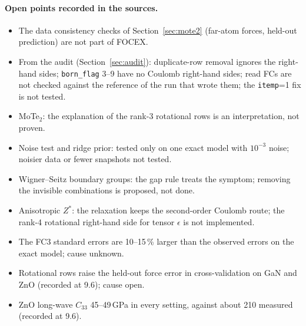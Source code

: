 \documentclass[11pt,a4paper]{article}
\newcommand{\code}[1]{\texttt{#1}}
\begin{document}
\paragraph{Open points recorded in the sources.}
\begin{itemize}
\item The data consistency checks of Section~\ref{sec:mote2} (far-atom forces, held-out prediction) are not part of FOCEX.
\item From the audit (Section~\ref{sec:audit}): duplicate-row removal ignores the right-hand sides; \code{born\_flag} 3--9
have no Coulomb right-hand sides; read FCs are not checked against the reference of the run that wrote them;
the \code{itemp}=1 fix is not tested.
\item MoTe$_2$: the explanation of the rank-3 rotational rows is an interpretation, not proven.
\item Noise test and ridge prior: tested only on one exact model with $10^{-3}$ noise; noisier data or fewer
snapshots not tested.
\item Wigner--Seitz boundary groups: the gap rule treats the symptom; removing the invisible combinations is
proposed, not done.
\item Anisotropic $Z^*$: the relaxation keeps the second-order Coulomb route; the rank-4 rotational right-hand
side for tensor $\epsilon$ is not implemented.
\item The FC3 standard errors are 10--15\,\% larger than the observed errors on the exact model; cause unknown.
\item Rotational rows raise the held-out force error in cross-validation on GaN and ZnO (recorded at 9.6);
cause open.
\item ZnO long-wave $C_{33}$ 45--49\,GPa in every setting, against about 210 measured (recorded at 9.6).
\end{itemize}
\end{document}
